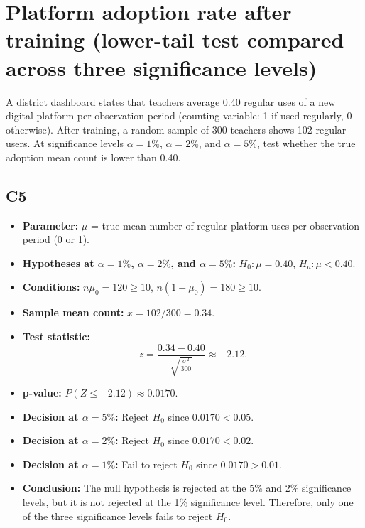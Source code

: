 
\section{Platform adoption rate after training (lower-tail test compared across three significance levels)}
A district dashboard states that teachers average 0.40 regular uses of a new digital platform per observation period (counting variable: 1 if used regularly, 0 otherwise). After training, a random sample of 300 teachers shows 102 regular users. At significance levels \(\alpha=1\%\), \(\alpha=2\%\), and \(\alpha=5\%\), test whether the true adoption mean count is lower than 0.40.

\subsection*{C5}
\begin{itemize}
	\item \textbf{Parameter:} \(\mu\) = true mean number of regular platform uses per observation period (0 or 1).
	\item \textbf{Hypotheses at \(\alpha=1\%\), \(\alpha=2\%\), and \(\alpha=5\%\):} \(H_0\colon \mu=0.40\), \(H_a\colon \mu<0.40\).
	\item \textbf{Conditions:} \(n\mu_0=120\ge10\), \(n(1-\mu_0)=180\ge10\).
	\item \textbf{Sample mean count:} \(\bar x=102/300=0.34\).
	\item \textbf{Test statistic:}
	\[
	z=\frac{0.34-0.40}{\sqrt{\frac{\sigma^2}{300}}}\approx -2.12.
	\]
	\item \textbf{p-value:} \(P(Z\le -2.12)\approx 0.0170\).
	\item \textbf{Decision at \(\alpha=5\%\):} Reject \(H_0\) since \(0.0170<0.05\).
	\item \textbf{Decision at \(\alpha=2\%\):} Reject \(H_0\) since \(0.0170<0.02\).
	\item \textbf{Decision at \(\alpha=1\%\):} Fail to reject \(H_0\) since \(0.0170>0.01\).
	\item \textbf{Conclusion:} The null hypothesis is rejected at the 5\% and 2\% significance levels, but it is not rejected at the 1\% significance level. Therefore, only one of the three significance levels fails to reject \(H_0\).
\end{itemize}

\begin{center}
\end{center}

